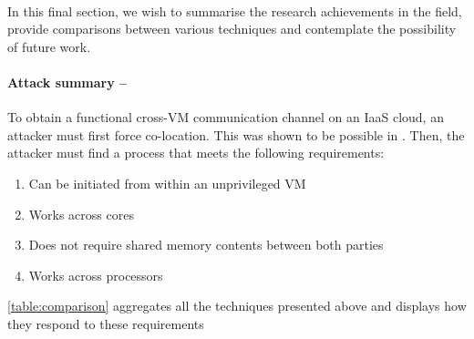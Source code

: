 \documentclass[orivec,envcountsame, a4paper, 11pt]{llncs}
\def\checkmark{\tikz\fill[scale=0.4](0,.35) -- (.25,0) -- (1,.7) -- (.25,.15) -- cycle;}
\begin{document}
\paragraph{} In this final section, we wish to summarise the research achievements in the field, provide comparisons between various techniques and contemplate the possibility of future work.

\paragraph{Attack summary --} To obtain a functional cross-VM communication channel on an IaaS cloud, an attacker must first force co-location. This was shown to be possible in \cite{Ristenpart2009,Varadarajan2015,Xu2015}. Then, the attacker must find a process that meets the following requirements:

	\begin{enumerate}[label=\alph*)]
		\item Can be initiated from within an unprivileged VM
		\item Works across cores
		\item Does not require shared memory contents between both parties
		\item Works across processors
	\end{enumerate}

\autoref{table:comparison} aggregates all the techniques presented above and displays how they respond to these requirements


\begin{comment}
	


\begin{table}[hbt]
	\begin{center}
  		\begin{tabular}{c|c|c|c|c|c|c|c}
    		Method & Used in & a) & b) & c) & d) & Achievable Bit Rate & Error Rate \\
    		\hline
    		Memory Bus Contention & \cite{Wu2012} & \checkmark & \checkmark & \checkmark & \checkmark & & \\
    		\hline
   			DRAM addressing & \cite{Pessl2016} &  & \checkmark & \checkmark & \checkmark & & \\
   			\hline
   			\textit{Prime+Probe} & \cite{Irazoqui2015,Liu2015,Maurice2015,Maurice2017,Pessl2016,Ristenpart2009,Xu2011,Zhang2012} & \checkmark & \checkmark & \checkmark &  & & \\
   			\hline
   			\textit{Flush+Reload} & \cite{Irazoqui2014,Yarom2014,Zhang2014} & \checkmark & \checkmark &  &  & & \\
   			\hline
   			\textit{Flush+Flush} & \cite{Gruss2016} & \checkmark & \checkmark &  &  & & \\
   			\hline
   			Memory de-duplication & \cite{Xiao2013} & \checkmark & \checkmark &  & \checkmark & & \\
  		\end{tabular}
  		\caption{Summary table of attempted methods}
  		\label{table:comparison}
  	\end{center}
\end{table}

\end{comment}	
\end{document}
